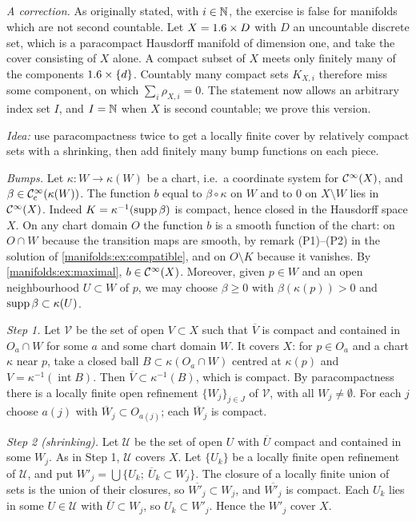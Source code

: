 \subsection*{}
\emph{A correction.} As originally stated, with $i\in\mathbb{N}$, the exercise is false for manifolds
which are not second countable. Let $X=1.6\times D$ with $D$ an uncountable discrete set,
which is a paracompact Hausdorff manifold of dimension one, and take the cover consisting
of $X$ alone. A compact subset of $X$ meets only finitely many of the components
$1.6\times\{d\}$. Countably many compact sets $K_{X,i}$ therefore miss some component, on
which $\sum_i\rho_{X,i}=0$. The statement now allows an arbitrary index set $I$, and
$I=\mathbb{N}$ when $X$ is second countable; we prove this version.

\emph{Idea:} use paracompactness twice to get a locally finite cover by relatively compact
sets with a shrinking, then add finitely many bump functions on each piece.

\emph{Bumps.} Let $\kappa:W\to\kappa(W)$ be a chart, i.e.\ a coordinate system for $\mathcal{C}^\infty(X)$,
and $\beta\in\mathcal{C}^\infty_{\mathrm{c}}(\kappa(W))$. The function $b$ equal to $\beta\circ\kappa$ on $W$ and to $0$ on
$X\setminus W$ lies in $\mathcal{C}^\infty(X)$. Indeed $K=\kappa^{-1}(\operatorname{supp}\beta)$ is compact, hence closed in
the Hausdorff space $X$. On any chart domain $O$ the function $b$ is a smooth function of
the chart: on $O\cap W$ because the transition maps are smooth, by remark (P1)--(P2) in
the solution of \cref{manifolds:ex:compatible}, and on $O\setminus K$ because it vanishes.
By \cref{manifolds:ex:maximal}, $b\in\mathcal{C}^\infty(X)$. Moreover, given $p\in W$ and an open
neighbourhood $U\subset W$ of $p$, we may choose $\beta\ge0$ with $\beta(\kappa(p))>0$ and
$\operatorname{supp}\beta\subset\kappa(U)$.

\emph{Step 1.} Let $\mathcal V$ be the set of open $V\subset X$ such that $\overline V$ is compact
and contained in $O_a\cap W$ for some $a$ and some chart domain $W$. It covers $X$: for
$p\in O_a$ and a chart $\kappa$ near $p$, take a closed ball $B\subset\kappa(O_a\cap W)$ centred at
$\kappa(p)$ and $V=\kappa^{-1}(\operatorname{int}B)$. Then $\overline V\subset\kappa^{-1}(B)$, which is
compact. By paracompactness there is a locally finite open refinement
$\{W_j\}_{j\in J}$ of $\mathcal V$, with all $W_j\ne\emptyset$. For each $j$ choose $a(j)$ with
$\overline W_j\subset O_{a(j)}$; each $\overline W_j$ is compact.

\emph{Step 2 (shrinking).} Let $\mathcal U$ be the set of open $U$ with $\overline U$ compact
and contained in some $W_j$. As in Step 1, $\mathcal U$ covers $X$. Let $\{U_k\}$ be a
locally finite open refinement of $\mathcal U$, and put $W'_j=\bigcup\{U_k;\ \overline U_k\subset W_j\}$.
The closure of a locally finite union of sets is the union of their closures, so
$\overline{W'_j}\subset W_j$, and $\overline{W'_j}$ is compact. Each $U_k$ lies in some
$U\in\mathcal U$ with $\overline U\subset W_j$, so $U_k\subset W'_j$. Hence the $W'_j$ cover $X$.

